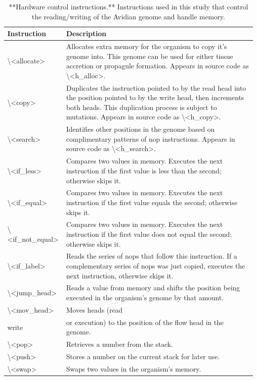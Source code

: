 \documentclass[
]{book}
\begin{document}
\begin{table}

\caption{\label{tab:Avida-instructions-Hardware-control-Table}**Hardware control instructions.** Instructions used in this study that control the reading/writing of the Avidian genome and handle memory.}
\centering
\begin{tabular}[t]{ll}
\toprule
Instruction & Description\\
\midrule
\textbackslash{}<allocate> & Allocates extra memory for the organism to copy it's genome into.  This genome can be used for either tissue accretion or propagule formation. Appears in source code as \textbackslash{}<h\_alloc>.\\
\textbackslash{}<copy> & Duplicates the instruction pointed to by the read head into the position pointed to by the write head, then increments both heads.  This duplication process is subject to mutations. Appears in source code as \textbackslash{}<h\_copy>.\\
\textbackslash{}<search> & Identifies other positions in the genome based on complimentary patterns of nop instructions. Appears in source code as \textbackslash{}<h\_search>.\\
\textbackslash{}<if\_less> & Compares two values in memory.  Executes the next instruction if the first value is less than the second; otherwise skips it.\\
\textbackslash{}<if\_equal> & Compares two values in memory.  Executes the next instruction if the first value equals the second; otherwise skips it.\\
\addlinespace
\textbackslash{}<if\_not\_equal> & Compares two values in memory.  Executes the next instruction if the first value does not equal the second; otherwise skips it.\\
\textbackslash{}<if\_label> & Reads the series of nops that follow this instruction. If a complementary series of nops was just copied, executes the next instruction, otherwise skips it.\\
\textbackslash{}<jump\_head> & Reads a value from memory and shifts the position being executed in the organism's genome by that amount.\\
\textbackslash{}<mov\_head> & Moves heads (read\\
write & or execution) to the position of the flow head in the genome.\\
\addlinespace
\textbackslash{}<pop> & Retrieves a number from the stack.\\
\textbackslash{}<push> & Stores a number on the current stack for later use.\\
\textbackslash{}<swap> & Swaps two values in the organism's memory.\\
\bottomrule
\end{tabular}
\end{table}
\end{document}
